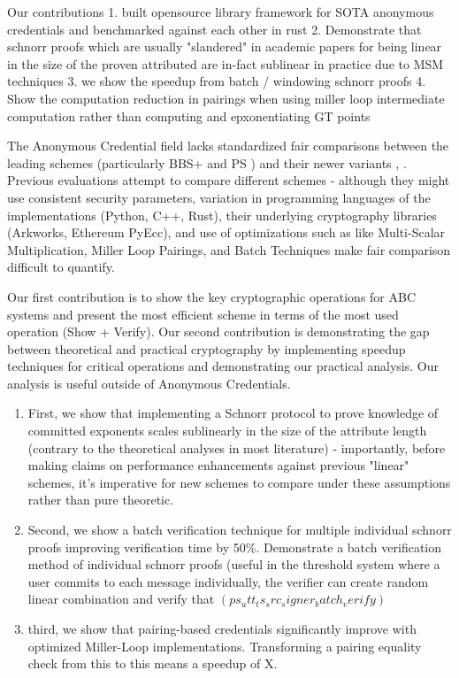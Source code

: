 Our contributions
1. built opensource library framework for SOTA anonymous credentials and benchmarked against each other in rust
2. Demonstrate that schnorr proofs which are usually "slandered" in academic papers for being linear in the size of the proven attributed are in-fact sublinear in practice due to MSM techniques
3. we show the speedup from batch / windowing schnorr proofs 
4. Show the computation reduction in pairings when using miller loop intermediate computation rather than computing and epxonentiating GT points



The Anonymous Credential field lacks standardized fair comparisons between the leading schemes (particularly BBS+ \cite{hutchison_constant-size_2006} and PS \cite{sako_short_2016}) and their newer variants \cite{camenisch_anonymous_2016}, \cite{tomescu_utt_2022}. Previous evaluations attempt to compare different schemes - although they might use consistent security parameters, variation in programming languages of the implementations (Python, C++, Rust), their underlying cryptography libraries (Arkworks, Ethereum PyEcc), and use of optimizations such as like Multi-Scalar Multiplication, Miller Loop Pairings, and Batch Techniques make fair comparison difficult to quantify. 



Our first contribution is to show the key cryptographic operations for ABC systems and present the most efficient scheme in terms of the most used operation (Show + Verify). 
Our second contribution is demonstrating the gap between theoretical and practical cryptography by implementing speedup techniques for critical operations and demonstrating our practical analysis. Our analysis is useful outside of Anonymous Credentials.
\begin{enumerate}
    \item First, we show that implementing a Schnorr protocol to prove knowledge of committed exponents scales sublinearly in the size of the attribute length (contrary to the theoretical analyses in most literature) - importantly, before making claims on performance enhancements against previous "linear" schemes, it's imperative for new schemes to compare under these assumptions rather than pure theoretic. 

    \item Second, we show a batch verification technique for multiple individual schnorr proofs improving verification time by 50\%. Demonstrate a batch verification method of individual schnorr proofs (useful in the threshold system where a user commits to each message individually, the verifier can create random linear combination and verify that $(ps_utt_ts_src_signer_batch_verify)$

    \item third, we show that pairing-based credentials significantly improve with optimized Miller-Loop implementations. Transforming a pairing equality check from this to this means a speedup of X. 
\end{enumerate}



